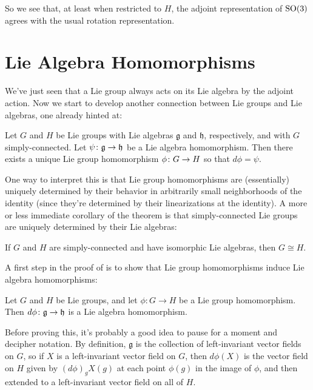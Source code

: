 \begin{example}
	So we see that, at least when restricted to $H$, the adjoint representation of $\operatorname{SO}(3)$ agrees with the usual rotation representation.
\end{example}

\section{Lie Algebra Homomorphisms}
\label{sec:Lie algebra homomorphisms}

We've just seen that a Lie group always acts on its Lie algebra by the adjoint action. Now we start to develop another connection between Lie groups and Lie algebras, one already hinted at:

\begin{theorem}\label{thm:Lie group Lie algebra correspondence}
	Let $G$ and $H$ be Lie groups with Lie algebras $\mathfrak{g}$ and $\mathfrak{h}$, respectively, and with $G$ simply-connected. Let $\psi \colon\thinspace\! \mathfrak{g} \to \mathfrak{h}$ be a Lie algebra homomorphism. Then there exists a unique Lie group homomorphism $\phi \colon\thinspace\! G \to H$ so that $d\phi = \psi$.
\end{theorem}

One way to interpret this is that Lie group homomorphisms are (essentially) uniquely determined by their behavior in arbitrarily small neighborhoods of the identity (since they're determined by their linearizations at the identity). A more or less immediate corollary of the theorem is that simply-connected Lie groups are uniquely determined by their Lie algebras:

\begin{corollary}\label{cor:sc Lie groups determined by Lie algebra}
	If $G$ and $H$ are simply-connected and have isomorphic Lie algebras, then $G \cong H$.
\end{corollary}

A first step in the proof of  is to show that Lie group homomorphisms induce Lie algebra homomorphisms:

\begin{proposition}\label{prop:Lie group hom implies Lie alg hom}
	Let $G$ and $H$ be Lie groups, and let $\phi: G \to H$ be a Lie group homomorphism. Then $d\phi \colon\thinspace\! \mathfrak{g} \to \mathfrak{h}$ is a Lie algebra homomorphism.
\end{proposition} 

Before proving this, it's probably a good idea to pause for a moment and decipher notation. By definition, $\mathfrak{g}$ is the collection of left-invariant vector fields on $G$, so if $X$ is a left-invariant vector field on $G$, then $d\phi(X)$ is the vector field on $H$ given by $\left(d\phi\right)_gX(g)$ at each point $\phi(g)$ in the image of $\phi$, and then extended to a left-invariant vector field on all of $H$.

